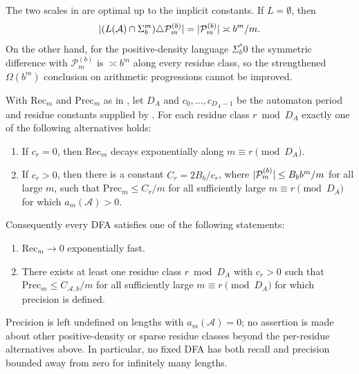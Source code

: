 \begin{remark}\label{rem:prime-diff-sharp}
  The two scales in  are optimal up
  to the implicit constants. If \(L=\emptyset\), then
  \[
    \lvert (L(\mathcal A)\cap\Sigma_b^m)\triangle\mathcal P_m^{(b)} \rvert
    =\lvert \mathcal P_m^{(b)} \rvert\asymp b^m/m .
  \]
  On the other hand, for the positive-density language
  \(\Sigma_b^\ast0\) the symmetric difference with
  \(\mathcal P_m^{(b)}\) is \(\asymp b^m\) along every residue class,
  so the strengthened \(\Omega(b^m)\) conclusion on arithmetic
  progressions cannot be improved.
\end{remark}

\begin{corollary}
  \label{cor:dfa-prime-recall-precision}
  With \(\mathrm{Rec}_m\) and \(\mathrm{Prec}_m\) as in
  , let \(D_A\) and
  \(c_0,\dots,c_{D_A-1}\) be the automaton period and residue constants supplied by
  . For each residue class
  \(r\bmod D_A\) exactly one of the following alternatives holds:
  \begin{enumerate}[label=\textup{(\alph*)}]
    \item If \(c_r=0\), then \(\mathrm{Rec}_m\) decays exponentially
    along \(m\equiv r\pmod {D_A}\).
    \item If \(c_r>0\), then there is a constant
    \(C_r=2B_b/c_r\), where
    \(\lvert \mathcal P_m^{(b)} \rvert\le B_b b^m/m\) for all large \(m\),
    such that \(\mathrm{Prec}_m\le C_r/m\) for all sufficiently large
    \(m\equiv r\pmod {D_A}\) for which \(a_m(\mathcal A)>0\).
  \end{enumerate}
  Consequently every DFA satisfies one of the following statements:
  \begin{enumerate}[label=\textup{(\roman*)}]
    \item \(\mathrm{Rec}_m\to 0\) exponentially fast.
    \item There exists at least one residue class
    \(r\bmod D_A\) with \(c_r>0\) such that
    \(\mathrm{Prec}_m\le C_{\mathcal A,b}/m\) for all sufficiently large
    \(m\equiv r\pmod {D_A}\) for which precision is defined.
  \end{enumerate}
  Precision is left undefined on lengths with \(a_m(\mathcal A)=0\);
  no assertion is made about other positive-density or sparse residue
  classes beyond the per-residue alternatives above.
  In particular, no fixed DFA has both recall and precision bounded
  away from zero for infinitely many lengths.
\end{corollary}

